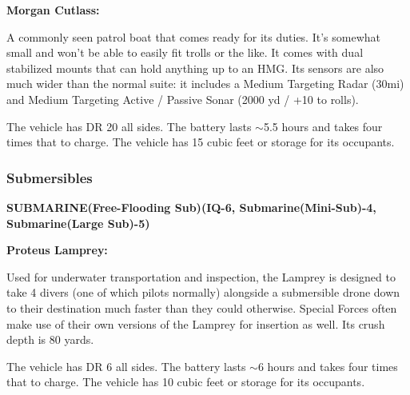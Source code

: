  \textbf{Morgan Cutlass:}
 
 A commonly seen patrol boat that comes ready for its duties. It's somewhat small and won't be able to easily fit trolls or the like. It comes with dual stabilized mounts that can hold anything up to an HMG. Its sensors are also much wider than the normal suite: it includes a Medium Targeting Radar (30mi) and Medium Targeting Active / Passive Sonar (2000 yd / +10 to rolls).
 
 The vehicle has DR 20 all sides. The battery lasts $\sim$5.5 hours and takes four times that to charge. The vehicle has 15 cubic feet or storage for its occupants. 
 
 \subsubsection{Submersibles}
 
 \textbf{SUBMARINE(Free-Flooding Sub)(IQ-6, Submarine(Mini-Sub)-4, Submarine(Large Sub)-5)}
 \begin{center} 
 	\begin{adjustwidth}{-9.5mm}{}
 	\end{adjustwidth}
 \end{center}

\textbf{Proteus Lamprey:}

Used for underwater transportation and inspection, the Lamprey is designed to take 4 divers (one of which pilots normally) alongside a submersible drone down to their destination much faster than they could otherwise. Special Forces often make use of their own versions of the Lamprey for insertion as well. Its crush depth is 80 yards.

The vehicle has DR 6 all sides. The battery lasts $\sim$6 hours and takes four times that to charge. The vehicle has 10 cubic feet or storage for its occupants. 

